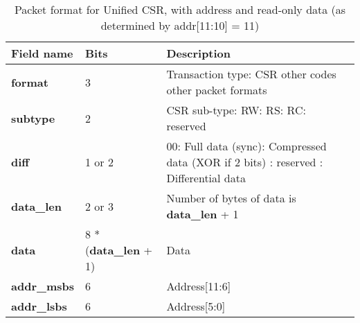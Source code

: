 \begin{table}[htp]
  \centering
  \caption{Packet format for Unified CSR, with address and read-only data (as determined by addr[11:10] = 11)}
  \label{tab:te_datadx0y11}
  \begin{tabulary}{\textwidth}{|l|p{38mm}|p{92mm}|}
    \hline
    {\bf Field name} & {\bf Bits} & {\bf Description} \\
    \hline
    \textbf{format} & 	3	& Transaction type: CSR\newline
		other codes other packet formats\\
    \hline
    \textbf{subtype} & 	2	& CSR sub-type: RW: RS: RC: reserved\\	
    \hline
    \textbf{diff} & 1 or 2 & 00: Full data (sync): Compressed data (XOR if 2 bits) : reserved : Differential data\\
    \hline
    \textbf{data\_len}	& 2 or 3 & Number of bytes of data is \textbf{data\_len} + 1\\
    \hline
    \textbf{data} & 8 * (\textbf{data\_len} + 1) & Data\\
    \hline
    \textbf{addr\_msbs} & 6  &	Address[11:6]\\
    \hline
    \textbf{addr\_lsbs} &  6 & Address[5:0] \\
    \hline
  \end{tabulary}
\end{table}

